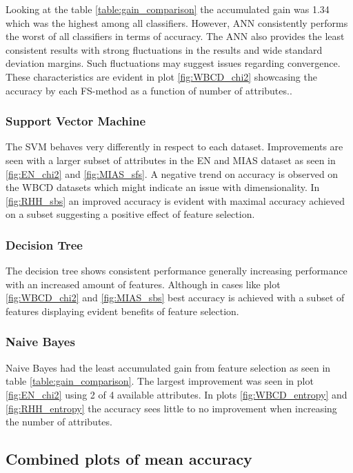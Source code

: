 Looking at the table \ref{table:gain_comparison} the accumulated gain was 1.34 which was the highest among all classifiers. However, ANN consistently performs the worst of all classifiers in terms of accuracy. The ANN also provides the least consistent results with strong fluctuations in the results and wide standard deviation margins. Such fluctuations may suggest issues regarding convergence. These characteristics are evident in plot \ref{fig:WBCD_chi2} showcasing the accuracy by each FS-method as a function of number of attributes..

\subsubsection{Support Vector Machine}

The SVM behaves very differently in respect to each dataset. Improvements are seen with a larger subset of attributes in the EN and MIAS dataset as seen in \ref{fig:EN_chi2} and \ref{fig:MIAS_sfs}. A negative trend on accuracy is observed on the WBCD datasets which might indicate an issue with dimensionality. In \ref{fig:RHH_sbs} an improved accuracy is evident with maximal accuracy achieved on a subset suggesting a positive effect of feature selection.

\subsubsection{Decision Tree}

The decision tree shows consistent performance generally increasing performance with an increased amount of features. Although in cases like plot \ref{fig:WBCD_chi2} and \ref{fig:MIAS_sbs} best accuracy is achieved with a subset of features displaying evident benefits of feature selection.

\subsubsection{Naive Bayes}

Naive Bayes had the least accumulated gain from feature selection as seen in table \ref{table:gain_comparison}. The largest improvement was seen in plot \ref{fig:EN_chi2} using 2 of 4 available attributes. In plots \ref{fig:WBCD_entropy} and \ref{fig:RHH_entropy} the accuracy sees little to no improvement when increasing the number of attributes.

\subsection{Combined plots of mean accuracy}






